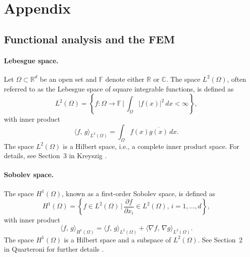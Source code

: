 \section{Appendix}\label{sec:appendix}


\subsection{Functional analysis and the FEM}\label{appendix:functional_analysis_and_the_fem}
\paragraph{Lebesgue space.} Let $\Omega \subset \mathbb{R}^d$ be an open set and $\mathbb{F}$ denote either $\mathbb{R}$ or $\mathbb{C}$. The space $L^2(\Omega)$, often referred to as the Lebesgue space of square integrable functions, is defined as 
\begin{equation*}
    L^2(\Omega) =
    \left\{
        f : \Omega \to \mathbb{F} \, \Bigg| \,
        \int_{\Omega} |f(x)|^2 \, dx < \infty
    \right\},
\end{equation*}
with inner product
\begin{equation*}
    \langle f,\, g \rangle_{L^2(\Omega)} = \int_\Omega f(x) \overline{g(x)} \, dx.
\end{equation*}
The space $L^2(\Omega)$ is a Hilbert space, i.e., a complete inner product space. For details, see Section~3 in Kreyszig \cite{kreyszigIntroductoryFunctionalAnalysis1989}.


\paragraph{Sobolev space.} The space $H^1(\Omega)$, known as a first-order Sobolev space, is defined as
\begin{equation*}
    H^1(\Omega) =
    \left\{
        f \in L^2(\Omega) \, \Bigg| \,
        \frac{\partial f}{\partial x_i} \in L^2(\Omega), \, i = 1, \dots, d  
    \right\},
\end{equation*}
with inner product
\begin{equation*}
    \langle f,\, g \rangle_{H^1(\Omega)} = 
    \langle f,\, g \rangle_{L^2(\Omega)} +
    \langle \nabla f,\, \nabla g \rangle_{L^2(\Omega)}.
\end{equation*}
The space $H^1(\Omega)$ is a Hilbert space and a subspace of $L^2(\Omega)$. See Section~2 in Quarteroni for further details \cite{quarteroniNumericalModelsDifferential2014}.



